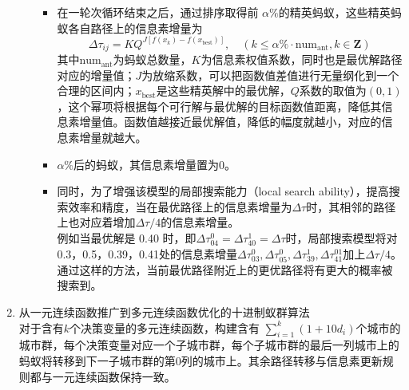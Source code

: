 \documentclass[../main.tex]{subfiles}
\begin{document}
\begin{enumerate}
\begin{enumerate}
		\begin{itemize}
			\item[\rom{1}] 在一轮次循环结束之后，通过排序取得前 \(\alpha \%\)的精英蚂蚁，这些精英蚂蚁各自路径上的信息素增量为
			\begin{equation}\label{equ:pass2}
				\Delta \tau _{ij} = K Q ^{J [f (x_{k}) - f (x _{\mathrm{best}})]} , \quad (k \le \alpha \% \cdot \mathrm{num}_{\mathrm{ant}} , k \in \mathbf{Z})
			\end{equation}
			其中\(\mathrm{num}_{\mathrm{ant}}\)为蚂蚁总数量，\(K\)为信息素权值系数，同时也是最优解路径对应的增量值；\(J\)为放缩系数，可以把函数值差值进行无量纲化到一个合理的区间内；\(x_{\mathrm{best}}\)是这些精英解中的最优解，\(Q\)系数的取值为\((0,1)\)，这个幂项将根据每个可行解与最优解的目标函数值距离，降低其信息素增量值。函数值越接近最优解值，降低的幅度就越小，对应的信息素增量就越大。
			\smallskip
			\item[\rom{2}] \(\alpha \%\)后的蚂蚁，其信息素增量置为0。
			\smallskip
			\item[\rom{3}] 同时，为了增强该模型的局部搜索能力（local search ability），提高搜索效率和精度，当在最优路径上的信息素增量为\(\Delta \tau\)时，其相邻的路径上也对应着增加\(\Delta \tau / 4\)的信息素增量。\\
			例如当最优解是 0.40 时，即\(\Delta \tau _{0 4} ^{0} = \Delta \tau ^{1} _{4 0} = \Delta \tau\)时，局部搜索模型将对0.3，0.5，0.39，0.41处的信息素增量\(\Delta \tau ^{0} _{03}, \Delta \tau_{05} ^{0} , \Delta \tau _{39} ^{1} , \Delta\tau _{41}^{01}\)加上\(\Delta \tau / 4\)。
			通过这样的方法，当前最优路径附近上的更优路径将有更大的概率被搜索到。
			\end{itemize}
		\end{enumerate}
	\item 从一元连续函数推广到多元连续函数优化的十进制蚁群算法\\
	对于含有\(k\)个决策变量的多元连续函数，构建含有
	\(\sum_{i = 1} ^{k} (1+ 10 d_{i})\)个城市的城市群，每个决策变量对应一个子城市群，每个子城市群的最后一列城市上的蚂蚁将转移到下一子城市群的第0列的城市上。其余路径转移与信息素更新规则都与一元连续函数保持一致。
\end{enumerate}
\end{document}

